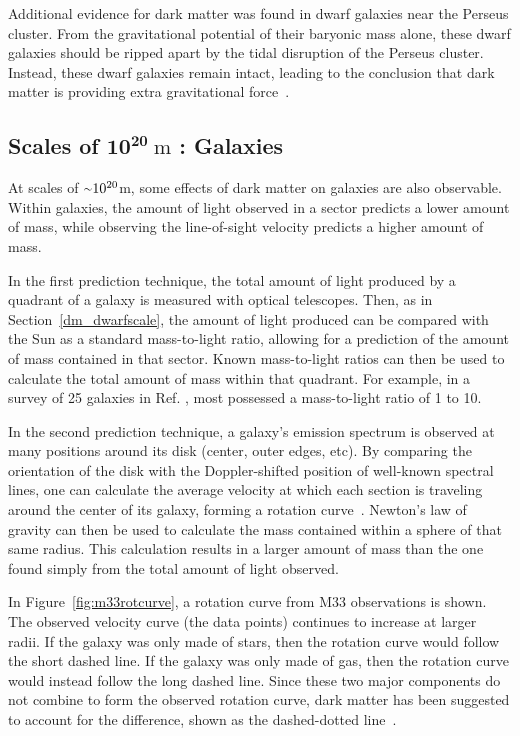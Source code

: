 Additional evidence for dark matter was found in dwarf galaxies near the Perseus cluster.
From the gravitational potential of their baryonic mass alone, these dwarf galaxies should be ripped apart by the tidal disruption of the Perseus cluster.
Instead, these dwarf galaxies remain intact, leading to the conclusion that dark matter is providing extra gravitational force~\cite{Penny2009}.

\FloatBarrier

\subsection[Scales of $10^{20}\:\text{m}$ : Galaxies]{Scales of $\mathbf{10^{20}}\:\text{m}$ : Galaxies}\label{dm_gal}
%
At scales of $\nicetilde 10^{20}$m, some effects of dark matter on galaxies are also observable.
Within galaxies, the amount of light observed in a sector predicts a lower amount of mass, while observing the line-of-sight velocity predicts a higher amount of mass.

In the first prediction technique, the total amount of light produced by a quadrant of a galaxy is measured with optical telescopes.
Then, as in Section~\ref{dm_dwarfscale}, the amount of light produced can be compared with the Sun as a standard mass-to-light ratio, allowing for a prediction of the amount of mass contained in that sector.
Known mass-to-light ratios can then be used to calculate the total amount of mass within that quadrant.
For example, in a survey of 25 galaxies in Ref. \cite{galaxy_mass_light_ratio}, most possessed a mass-to-light ratio of 1 to 10.

In the second prediction technique, a galaxy's emission spectrum is observed at many positions around its disk (center, outer edges, etc).
By comparing the orientation of the disk with the Doppler-shifted position of well-known spectral lines, one can calculate the average velocity at which each section is traveling around the center of its galaxy, forming a rotation curve~\cite{rotation_curve_review, spiral_galaxy_rot_curve, milkyway_dm_evidence}.
Newton's law of gravity can then be used to calculate the mass contained within a sphere of that same radius.
This calculation results in a larger amount of mass than the one found simply from the total amount of light observed.

In Figure~\ref{fig:m33rotcurve}, a rotation curve from M33 observations is shown.
The observed velocity curve (the data points) continues to increase at larger radii.
If the galaxy was only made of stars, then the rotation curve would follow the short dashed line.
If the galaxy was only made of gas, then the rotation curve would instead follow the long dashed line.
Since these two major components do not combine to form the observed rotation curve, dark matter has been suggested to account for the difference, shown as the dashed-dotted line~\cite{m33rotcurve}.
    
